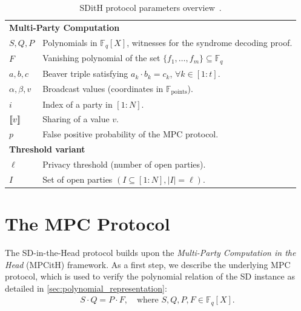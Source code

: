 \documentclass[11pt]{report}
\theoremstyle{definition}
\theoremstyle{plain}
\begin{document}
\begin{table}[]
\begin{tabular}{p{}p{}}
    \multicolumn{2}{l}{\textbf{Multi-Party Computation}}                                                                                  \\
    $S, Q, P$                    & Polynomials in $\mathbb{F}_q[X]$, witnesses for the syndrome decoding proof.                           \\
    $F$                          & Vanishing polynomial of the set $\{f_1, \ldots, f_m\} \subseteq \mathbb{F}_q$                          \\
    $a, b, c$                    & Beaver triple satisfying $a_k \cdot b_k = c_k$, $\forall k \in [1 : t]$.                               \\
    $\alpha, \beta, v$           & Broadcast values (coordinates in $\mathbb{F}_{\text{points}}$).                                        \\
    $i$                          & Index of a party in $[1 : N]$.                                                                         \\
    $\llbracket v \rrbracket$                     & Sharing of a value $v$.                                                                                \\
    $p$                          & False positive probability of the MPC protocol.                                                        \\ \hline

    \multicolumn{2}{l}{\textbf{Threshold variant}}                                                                                        \\
    $\ell$                       & Privacy threshold (number of open parties).                                                            \\
    $I$                          & Set of open parties $(I \subseteq [1 : N], |I| = \ell)$.                                               \\
  \end{tabular}
  \caption{SDitH protocol parameters overview~\cite[Table 1]{aguilarsyndrome11}.}\label{tab:sdith-protocol-parameters}
\end{table}

\section{The MPC Protocol}\label{sec:sdith-mpc}

The SD-in-the-Head protocol builds upon the \textit{Multi-Party Computation in the Head} (MPCitH) framework. As a first step, we describe the underlying MPC protocol, which is used to verify the polynomial relation of the SD instance as detailed in \autoref{sec:polynomial_representation}:
\begin{align*}
  S \cdot Q = P \cdot F, \quad \text{where } S, Q, P, F \in \mathbb{F}_q[X].
\end{align*}
\end{document}
